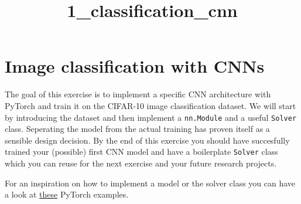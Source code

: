 \documentclass[11pt]{article}
\title{1\_classification\_cnn}
\begin{document}
    
    
    \maketitle
    
    

    
    \section{Image classification with
CNNs}\label{image-classification-with-cnns}

The goal of this exercise is to implement a specific CNN architecture
with PyTorch and train it on the CIFAR-10 image classification dataset.
We will start by introducing the dataset and then implement a
\texttt{nn.Module} and a useful \texttt{Solver} class. Seperating the
model from the actual training has proven itself as a sensible design
decision. By the end of this exercise you should have succesfully
trained your (possible) first CNN model and have a boilerplate
\texttt{Solver} class which you can reuse for the next exercise and your
future research projects.

For an inspiration on how to implement a model or the solver class you
can have a look at \href{https://github.com/pytorch/examples}{these}
PyTorch examples.
\end{document}
